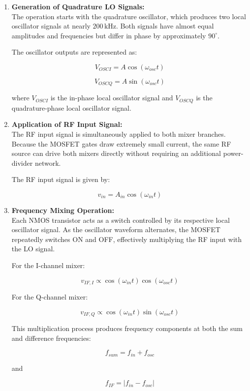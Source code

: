 \documentclass[conference]{IEEEtran}
\begin{document}
\begin{enumerate}

\item \textbf{Generation of Quadrature LO Signals:} \\

The operation starts with the quadrature oscillator, which produces two local oscillator signals at nearly $200\,\text{kHz}$. 
Both signals have almost equal amplitudes and frequencies but differ in phase by approximately $90^\circ$.

The oscillator outputs are represented as:

\[
V_{OSCI}=A\cos(\omega_{osc}t)
\]

\[
V_{OSCQ}=A\sin(\omega_{osc}t)
\]

where $V_{OSCI}$ is the in-phase local oscillator signal and $V_{OSCQ}$ is the quadrature-phase local oscillator signal.

\item \textbf{Application of RF Input Signal:} \\

The RF input signal is simultaneously applied to both mixer branches. 
Because the MOSFET gates draw extremely small current, the same RF source can drive both mixers directly without requiring an additional power-divider network.

The RF input signal is given by:

\[
v_{in}=A_{in}\cos(\omega_{in}t)
\]

\item \textbf{Frequency Mixing Operation:} \\

Each NMOS transistor acts as a switch controlled by its respective local oscillator signal. 
As the oscillator waveform alternates, the MOSFET repeatedly switches ON and OFF, effectively multiplying the RF input with the LO signal.

For the I-channel mixer:

\[
v_{IF,I}\propto \cos(\omega_{in}t)\cos(\omega_{osc}t)
\]

For the Q-channel mixer:

\[
v_{IF,Q}\propto \cos(\omega_{in}t)\sin(\omega_{osc}t)
\]

This multiplication process produces frequency components at both the sum and difference frequencies:

\[
f_{sum}=f_{in}+f_{osc}
\]

and

\[
f_{IF}=|f_{in}-f_{osc}|
\]


\end{enumerate}
\end{document}
